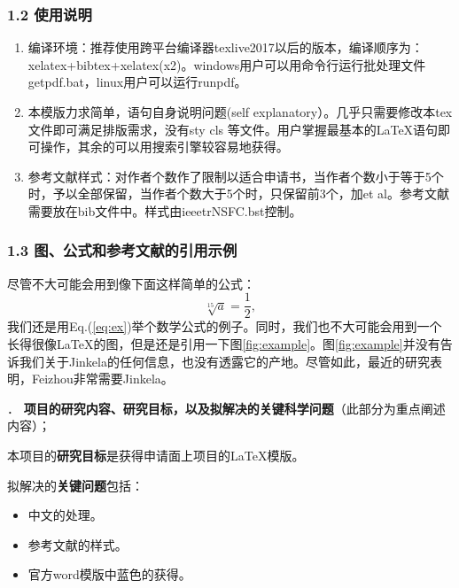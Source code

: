 \documentclass[12pt,UTF8,AutoFakeBold,a4paper]{ctexart} %
\newcommand{\sihao}{\fontsize{14pt}{\baselineskip}\selectfont}
\begin{document}
\subsubsection{1.2 使用说明}\label{sss:instruction}

\begin{enumerate}
\item 编译环境：推荐使用跨平台编译器texlive2017以后的版本，编译顺序为：xelatex+bibtex+xelatex(x2)。windows用户可以用命令行运行批处理文件getpdf.bat，linux用户可以运行runpdf。
\item 本模版力求简单，语句自身说明问题(self explanatory）。几乎只需要修改本tex文件即可满足排版需求，没有sty cls 等文件。用户掌握最基本的\LaTeX 语句即可操作，其余的可以用搜索引擎较容易地获得。
\item 参考文献样式：对作者个数作了限制以适合申请书，当作者个数小于等于5个时，予以全部保留，当作者个数大于5个时，只保留前3个，加et al。参考文献需要放在bib文件中。样式由ieeetrNSFC.bst控制。
\end{enumerate}

\subsubsection{1.3 图、公式和参考文献的引用示例}
尽管不大可能会用到像下面这样简单的公式：
\begin{equation}
\label{eq:ex}
\sqrt[15]{a}=\frac{1}{2},
\end{equation}
我们还是用Eq.(\ref{eq:ex})举个数学公式的例子。同时，我们也不大可能会用到一个长得很像\LaTeX 的图，但是还是引用一下图\ref{fig:example}。图\ref{fig:example}并没有告诉我们关于Jinkela\cite{John1997,Smith1900}的任何信息，也没有透露它的产地\cite{Piter1992}。尽管如此，最近的研究表明，Feizhou非常需要Jinkela\cite{John1997}。





\newpage

{\sihao \color{MsBlue} ． {\bfseries 项目的研究内容、研究目标，以及拟解决的关键科学问题}（此部分为重点阐述内容）；}

本项目的{\bfseries 研究目标}是获得申请面上项目的\LaTeX 模版。

拟解决的{\bfseries 关键问题}包括：

\begin{itemize}
\item 中文的处理。
\item 参考文献\cite{John1997,Smith1900,Piter1992}的样式。
\item 官方word模版中蓝色的获得。
\end{itemize}
\end{document}
